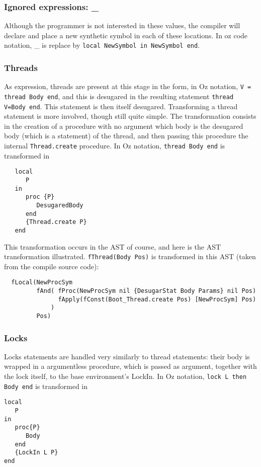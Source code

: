 \documentclass[a4paper]{memoir}
\begin{document}
\subsubsection{Ignored expressions: \_}
Although the programmer is not interested in these values, the compiler will declare and place a new synthetic symbol in each of these locations. In oz code notation, \_ is replace by \lstinline!local NewSymbol in NewSymbol end!.

\subsubsection{Threads}
As expression, threads are present at this stage in the form, in Oz notation, \lstinline!V = thread Body end!, and this is desugared in the resulting statement \lstinline!thread V=Body end!. This statement is then itself desugared.
Transforming a thread statement is more involved, though still quite simple. The transformation consists in the creation of a procedure with no argument which body is the desugared body (which is a statement) of the thread, and then passing this procedure the internal \lstinline!Thread.create! procedure.
In Oz notation, \lstinline!thread Body end! is transformed in 
\begin{lstlisting}
   local 
      P 
   in 
      proc {P} 
         DesugaredBody 
      end 
      {Thread.create P}
   end
\end{lstlisting}
This transformation occurs in the AST of course, and here is the AST transformation illustrated. \lstinline!fThread(Body Pos)! is transformed in this AST (taken from the compile source code):
\begin{lstlisting}
  fLocal(NewProcSym 
         fAnd( fProc(NewProcSym nil {DesugarStat Body Params} nil Pos) 
               fApply(fConst(Boot_Thread.create Pos) [NewProcSym] Pos)
             ) 
         Pos)
\end{lstlisting}

\subsubsection{Locks}
Locks statements are handled very similarly to thread statements: their body is wrapped in a argumentless procedure, which is passed as argument, together with the lock itself, to the base environment's LockIn. In Oz notation, \lstinline!lock L then Body end! is transformed in
\begin{lstlisting}
local
   P
in
   proc{P}
      Body
   end
   {LockIn L P}
end
\end{lstlisting}
\end{document}

